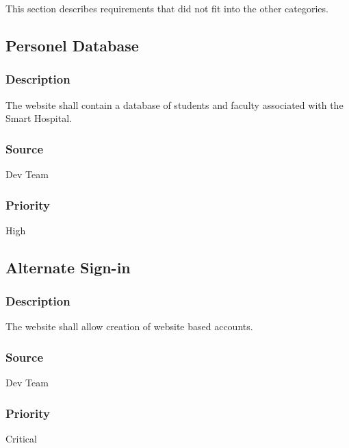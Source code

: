 This section describes requirements that did not fit into the other categories.


\subsection{Personel Database}
\subsubsection{Description}
The website shall contain a database of students and faculty associated with the Smart Hospital.
\subsubsection{Source}
Dev Team
\subsubsection{Priority}
High

\subsection{Alternate Sign-in}
\subsubsection{Description}
The website shall allow creation of website based accounts.
\subsubsection{Source}
Dev Team
\subsubsection{Priority}
Critical


